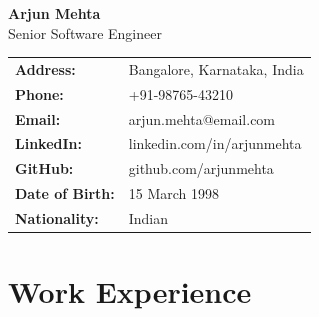 \documentclass[10pt,a4paper]{article}
\begin{document}
\noindent\begin{minipage}[t]{0.22\textwidth}
\end{minipage}%
\hfill%
\begin{minipage}[t]{0.74\textwidth}
\vspace{0pt}
{\fontsize{22pt}{26pt}\selectfont\color{euroblue}\textbf{Arjun Mehta}}\\[4pt]
{\large Senior Software Engineer}\\[10pt]

\begin{tabular}{@{}l l@{}}
\textbf{Address:} & Bangalore, Karnataka, India\\
\textbf{Phone:} & +91-98765-43210\\
\textbf{Email:} & arjun.mehta@email.com\\
\textbf{LinkedIn:} & linkedin.com/in/arjunmehta\\
\textbf{GitHub:} & github.com/arjunmehta\\
\textbf{Date of Birth:} & 15 March 1998\\
\textbf{Nationality:} & Indian\\
\end{tabular}
\end{minipage}

\vspace{12pt}

\section{Work Experience}
\end{document}
